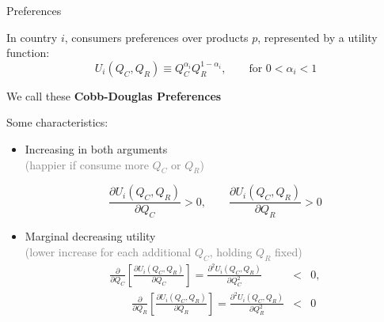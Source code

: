 \documentclass[notes,11pt, aspectratio=169, xcolor=table]{beamer}
\newenvironment{wideitemize}{\itemize\addtolength{\itemsep}{10pt}}{\enditemize}
\begin{document}
\begin{frame}{Preferences}
\begin{wideitemize}
        \item In country $i$, consumers preferences over products $p$, represented by a utility function:
        \begin{equation*}
            U_i(Q_C,Q_R) \equiv Q_C^{\alpha_i} Q_R^{1-\alpha_i}, \qquad \text{for } 0 < \alpha_i < 1   
        \end{equation*}
        \item<2-> We call these \textbf{Cobb-Douglas Preferences}
        \item<3-> Some characteristics:
        \begin{itemize}
            \item<3-> Increasing in both arguments \\
            \qquad \qquad \textcolor{gray}{(happier if consume more $Q_C$ or $Q_R$)}

            \begin{equation*}
                \frac{\partial U_i(Q_C,Q_R)}{\partial Q_C} > 0, \qquad \frac{\partial U_i(Q_C,Q_R)}{\partial Q_R} > 0
            \end{equation*}
            \item<4-> Marginal decreasing utility \\
            \qquad \qquad \textcolor{gray}{(lower increase for each additional $Q_C$, holding $Q_R$ fixed)}
            \begin{eqnarray*}
                \frac{\partial}{\partial Q_C} \left[ \frac{\partial U_i(Q_C,Q_R)}{\partial Q_C} \right] = \frac{\partial^2 U_i(Q_C,Q_R)}{\partial Q_C^2} &<& 0, \\
                \qquad \frac{\partial}{\partial Q_R} \left[ \frac{\partial U_i(Q_C,Q_R)}{\partial Q_R} \right] = \frac{\partial^2 U_i(Q_C,Q_R)}{\partial Q_R^2} &<& 0
            \end{eqnarray*}
            
        \end{itemize}
    \end{wideitemize}
\end{frame}
\end{document}
